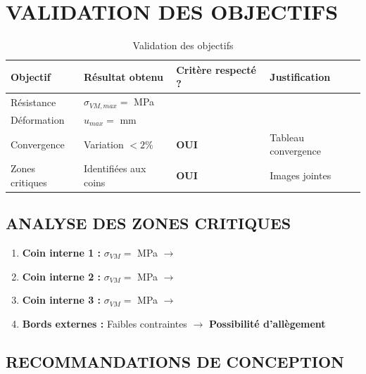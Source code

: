 \documentclass[12pt,a4paper]{article}
\begin{document}
			
			
			
			
			
	\newpage
	
	
	
	
	
	
	
	\section{VALIDATION DES OBJECTIFS}
	
					\begin{table}[H]
						\centering
						\begin{tabular}{p{3cm}|p{4cm}|p{4cm}|p{3cm}}
							\toprule
							\textbf{Objectif} & \textbf{Résultat obtenu} & \textbf{Critère respecté ?} & \textbf{Justification} \\
							\midrule
							Résistance & $\sigma_{VM,max} = $ \dotfill MPa & \dotfill & \dotfill \\
							Déformation & $u_{max} = $ \dotfill mm & \dotfill & \dotfill \\
							Convergence & Variation $< 2\%$ & \textbf{OUI} & Tableau convergence \\
							Zones critiques & Identifiées aux coins & \textbf{OUI} & Images jointes \\
							\bottomrule
						\end{tabular}
						\caption{Validation des objectifs}
					\end{table}
			
				\subsection{ANALYSE DES ZONES CRITIQUES}
				
						\begin{enumerate}
							\item \textbf{Coin interne 1 :} $\sigma_{VM} = $ \dotfill MPa $\to$ \dotfill
							\item \textbf{Coin interne 2 :} $\sigma_{VM} = $ \dotfill MPa $\to$ \dotfill
							\item \textbf{Coin interne 3 :} $\sigma_{VM} = $ \dotfill MPa $\to$ \dotfill
							\item \textbf{Bords externes :} Faibles contraintes $\to$ \textbf{Possibilité d'allègement}
						\end{enumerate}
				
				\subsection{RECOMMANDATIONS DE CONCEPTION}
				
\end{document}
